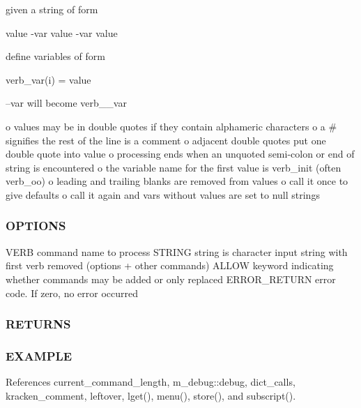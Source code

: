 given a string of form

value -\/var value -\/var value

define variables of form

verb\+\_\+var(i) = value

--var will become verb\+\_\+\+\_\+var

o values may be in double quotes if they contain alphameric characters o a \# signifies the rest of the line is a comment o adjacent double quotes put one double quote into value o processing ends when an unquoted semi-\/colon or end of string is encountered o the variable name for the first value is verb\+\_\+init (often verb\+\_\+oo) o leading and trailing blanks are removed from values o call it once to give defaults o call it again and vars without values are set to null strings

\subsubsection*{O\+P\+T\+I\+O\+NS}

\begin{DoxyVerb}VERB          command name to process
STRING        string is character input string with first verb removed (options + other commands)
ALLOW         keyword indicating whether commands may be added or only replaced
ERROR_RETURN  error code. If zero, no error occurred
\end{DoxyVerb}


\subsubsection*{R\+E\+T\+U\+R\+NS}

\subsubsection*{E\+X\+A\+M\+P\+LE}

References current\+\_\+command\+\_\+length, m\+\_\+debug\+::debug, dict\+\_\+calls, kracken\+\_\+comment, leftover, lget(), menu(), store(), and subscript().

\mbox{\label{namespacem__kracken_ad4f3d7c793c90789b175097b433035da}} 
